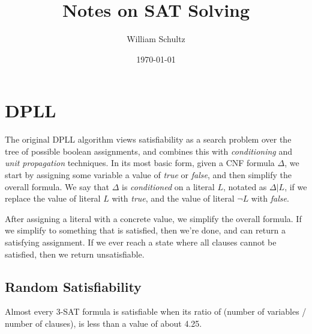\documentclass[12pt]{article}
\begin{document}
\title{Notes on SAT Solving}
\author{William Schultz}
\date{\today}

\maketitle

\section{DPLL}

The original DPLL algorithm views satisfiability as a search problem over the tree of possible boolean assignments, and combines this with \textit{conditioning} and \textit{unit propagation} techniques. In its most basic form, given a CNF formula $\Delta$, we start by assigning some variable a value of \textit{true} or \textit{false}, and then simplify the overall formula. We say that $\Delta$ is \textit{conditioned} on a literal $L$, notated as $\Delta|L$, if we replace the value of literal $L$ with \textit{true}, and the value of literal $\neg L$ with \textit{false}.

After assigning a literal with a concrete value, we simplify the overall formula. If we simplify to something that is satisfied, then we're done, and can return a satisfying assignment. If we ever reach a state where all clauses cannot be satisfied, then we return unsatisfiable.

\subsection*{Random Satisfiability}

Almost every 3-SAT formula is satisfiable when its ratio of (number of variables / number of clauses), is less than a value of about 4.25.
\end{document}
